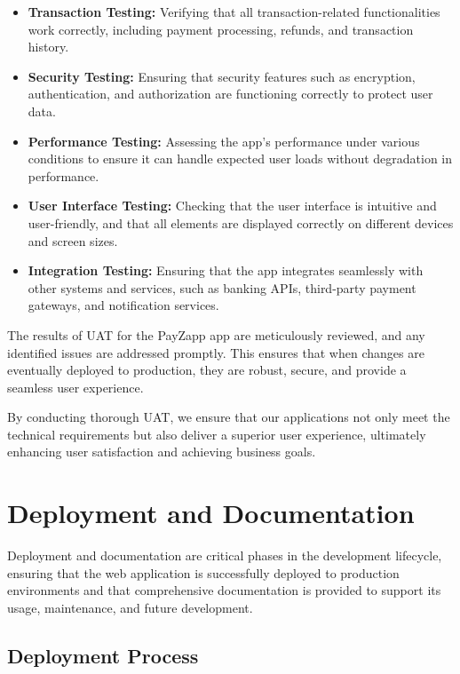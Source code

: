 \documentclass[12pt,a4paper]{report}
\begin{document}
\begin{itemize}
    \item \textbf{Transaction Testing:} Verifying that all transaction-related functionalities work correctly, including payment processing, refunds, and transaction history.
    
    \item \textbf{Security Testing:} Ensuring that security features such as encryption, authentication, and authorization are functioning correctly to protect user data.
    
    \item \textbf{Performance Testing:} Assessing the app's performance under various conditions to ensure it can handle expected user loads without degradation in performance.
    
    \item \textbf{User Interface Testing:} Checking that the user interface is intuitive and user-friendly, and that all elements are displayed correctly on different devices and screen sizes.
    
    \item \textbf{Integration Testing:} Ensuring that the app integrates seamlessly with other systems and services, such as banking APIs, third-party payment gateways, and notification services.
\end{itemize}

The results of UAT for the PayZapp app are meticulously reviewed, and any identified issues are addressed promptly. This ensures that when changes are eventually deployed to production, they are robust, secure, and provide a seamless user experience.

By conducting thorough UAT, we ensure that our applications not only meet the technical requirements but also deliver a superior user experience, ultimately enhancing user satisfaction and achieving business goals.

\section{Deployment and Documentation}

Deployment and documentation are critical phases in the development lifecycle, ensuring that the web application is successfully deployed to production environments and that comprehensive documentation is provided to support its usage, maintenance, and future development.


\subsection{Deployment Process}
\end{document}
